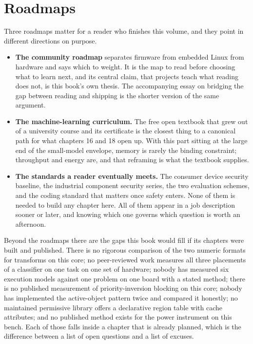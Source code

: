 \section{Roadmaps}

Three roadmaps matter for a reader who finishes this volume, and they point in
different directions on purpose.

\begin{itemize}
\item \textbf{The community roadmap} separates firmware from embedded Linux from
hardware and says which to weight. It is the map to read before choosing what to
learn next, and its central claim, that projects teach what reading does not, is
this book's own thesis. The accompanying essay on bridging the gap between
reading and shipping is the shorter version of the same argument.
\item \textbf{The machine-learning curriculum.} The free open textbook that grew
out of a university course and its certificate is the closest thing to a
canonical path for what chapters 16 and 18 open up. With this part sitting at
the large end of the small-model envelope, memory is rarely the binding
constraint; throughput and energy are, and that reframing is what the textbook
supplies.
\item \textbf{The standards a reader eventually meets.} The consumer device
security baseline, the industrial component security series, the two evaluation
schemes, and the coding standard that matters once safety enters. None of them
is needed to build any chapter here. All of them appear in a job description
sooner or later, and knowing which one governs which question is worth an
afternoon.
\end{itemize}

Beyond the roadmaps there are the gaps this book would fill if its chapters were
built and published. There is no rigorous comparison of the two numeric formats
for transforms on this core; no peer-reviewed work measures all three placements
of a classifier on one task on one set of hardware; nobody has measured six
execution models against one problem on one board with a stated method; there is
no published measurement of priority-inversion blocking on this core; nobody has
implemented the active-object pattern twice and compared it honestly; no
maintained permissive library offers a declarative region table with cache
attributes; and no published method exists for the power instrument on this
bench. Each of those falls inside a chapter that is already planned, which is
the difference between a list of open questions and a list of excuses.
